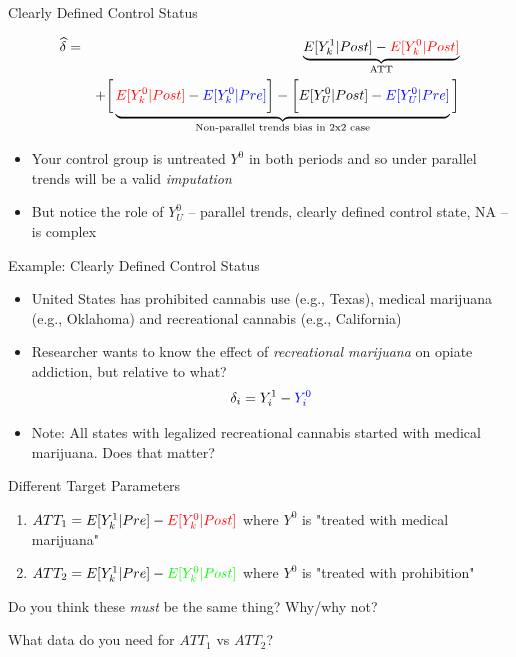 \documentclass{beamer}
\begin{document}
\begin{frame}{Clearly Defined Control Status}

\begin{eqnarray*}
\widehat{\delta} &=& \underbrace{E[Y^1_k | Post] - \textcolor{red}{E[Y^0_k | Post]}}_{\mathclap{\text{ATT}}} \\
&& + \bigg [  \underbrace{\textcolor{red}{E[Y^0_k | Post]} - \textcolor{blue}{E[Y^0_k | Pre]} \bigg ] - \bigg [ E[Y^0_U | Post] - \textcolor{blue}{E[Y_U^0 | Pre]} }_{\mathclap{\text{Non-parallel trends bias in 2x2 case}}} \bigg ]
\end{eqnarray*}

\begin{itemize}
\item Your control group is untreated $Y^0$ in both periods and so under parallel trends will be a valid \emph{imputation}
\item But notice the role of $Y^0_U$ -- parallel trends, clearly defined control state, NA -- is complex
\end{itemize}
\end{frame}



\begin{frame}{Example: Clearly Defined Control Status}

\begin{itemize}
\item United States has prohibited cannabis use (e.g., Texas), medical marijuana (e.g., Oklahoma) and recreational cannabis (e.g., California)
\item Researcher wants to know the effect of \emph{recreational marijuana} on opiate addiction, but relative to what?  $$\delta_i = Y^1_i - \textcolor{blue}{Y^0_i}$$
\item Note: All states with legalized recreational cannabis started with medical marijuana.  Does that matter?

\end{itemize}

\end{frame}

\begin{frame}{Different Target Parameters}

\begin{enumerate}
\item $ATT_1 = E[Y^1_k|Pre] - \textcolor{red}{E[Y^0_k|Post]}$ where $Y^0$ is "treated with medical marijuana"
\item $ATT_2 = E[Y^1_k|Pre] - \textcolor{green}{E[Y^0_k|Post]}$ where $Y^0$ is "treated with prohibition"
\end{enumerate}
\bigskip
Do you think these \emph{must} be the same thing?  Why/why not? 

\bigskip

What data do you need for $ATT_1$ vs $ATT_2$?

\end{frame}
\end{document}
